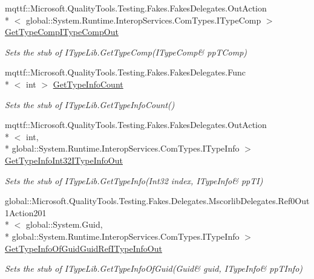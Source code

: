 \begin{DoxyCompactItemize}
mqttf\-::\-Microsoft.\-Quality\-Tools.\-Testing.\-Fakes.\-Fakes\-Delegates.\-Out\-Action\\*
$<$ global\-::\-System.\-Runtime.\-Interop\-Services.\-Com\-Types.\-I\-Type\-Comp $>$ \hyperlink{class_system_1_1_runtime_1_1_interop_services_1_1_com_types_1_1_fakes_1_1_stub_i_type_lib_a42087c469d29f62864aa523aad99c46e}{Get\-Type\-Comp\-I\-Type\-Comp\-Out}
\begin{DoxyCompactList}\small\item\em Sets the stub of I\-Type\-Lib.\-Get\-Type\-Comp(I\-Type\-Comp\& pp\-T\-Comp)\end{DoxyCompactList}\item 
mqttf\-::\-Microsoft.\-Quality\-Tools.\-Testing.\-Fakes.\-Fakes\-Delegates.\-Func\\*
$<$ int $>$ \hyperlink{class_system_1_1_runtime_1_1_interop_services_1_1_com_types_1_1_fakes_1_1_stub_i_type_lib_abb1a9b57dcd91bf558ec32f6e2cf8f4f}{Get\-Type\-Info\-Count}
\begin{DoxyCompactList}\small\item\em Sets the stub of I\-Type\-Lib.\-Get\-Type\-Info\-Count()\end{DoxyCompactList}\item 
mqttf\-::\-Microsoft.\-Quality\-Tools.\-Testing.\-Fakes.\-Fakes\-Delegates.\-Out\-Action\\*
$<$ int, \\*
global\-::\-System.\-Runtime.\-Interop\-Services.\-Com\-Types.\-I\-Type\-Info $>$ \hyperlink{class_system_1_1_runtime_1_1_interop_services_1_1_com_types_1_1_fakes_1_1_stub_i_type_lib_a2a4dac5a32352e2406b23bf32e3e697f}{Get\-Type\-Info\-Int32\-I\-Type\-Info\-Out}
\begin{DoxyCompactList}\small\item\em Sets the stub of I\-Type\-Lib.\-Get\-Type\-Info(Int32 index, I\-Type\-Info\& pp\-T\-I)\end{DoxyCompactList}\item 
global\-::\-Microsoft.\-Quality\-Tools.\-Testing.\-Fakes.\-Delegates.\-Mscorlib\-Delegates.\-Ref0\-Out1\-Action201\\*
$<$ global\-::\-System.\-Guid, \\*
global\-::\-System.\-Runtime.\-Interop\-Services.\-Com\-Types.\-I\-Type\-Info $>$ \hyperlink{class_system_1_1_runtime_1_1_interop_services_1_1_com_types_1_1_fakes_1_1_stub_i_type_lib_a04b019f502a0d97ff58a323999456ccd}{Get\-Type\-Info\-Of\-Guid\-Guid\-Ref\-I\-Type\-Info\-Out}
\begin{DoxyCompactList}\small\item\em Sets the stub of I\-Type\-Lib.\-Get\-Type\-Info\-Of\-Guid(Guid\& guid, I\-Type\-Info\& pp\-T\-Info)\end{DoxyCompactList}\item 

\end{DoxyCompactItemize}
